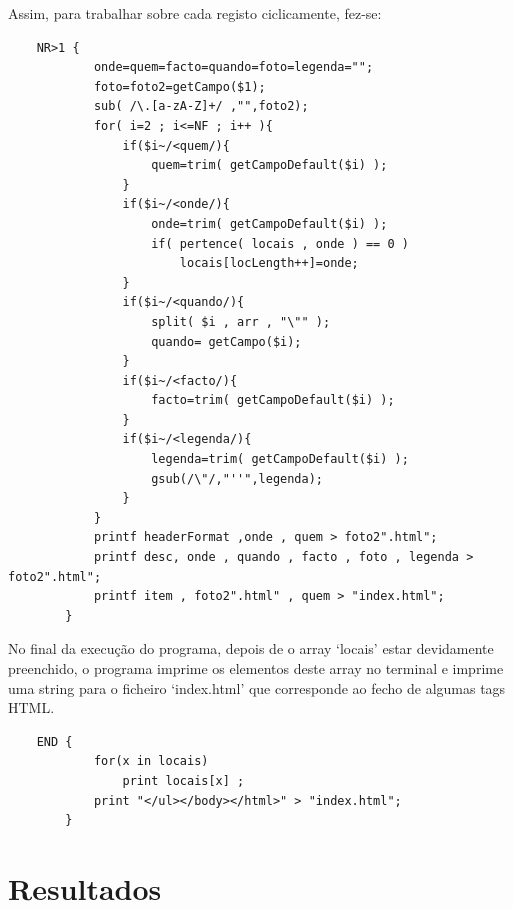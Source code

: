 \documentclass{report}
\begin{document}
Assim, para trabalhar sobre cada registo ciclicamente, fez-se:
\begin{verbatim}
	NR>1 {
	    	onde=quem=facto=quando=foto=legenda="";
	    	foto=foto2=getCampo($1);
	    	sub( /\.[a-zA-Z]+/ ,"",foto2);
	    	for( i=2 ; i<=NF ; i++ ){
	        	if($i~/<quem/){
	             	quem=trim( getCampoDefault($i) );
	        	}
	        	if($i~/<onde/){
	             	onde=trim( getCampoDefault($i) );
	             	if( pertence( locais , onde ) == 0 )
	                	locais[locLength++]=onde;
	        	}
	        	if($i~/<quando/){
	             	split( $i , arr , "\"" );
	             	quando= getCampo($i);
	        	}
	        	if($i~/<facto/){
	            	facto=trim( getCampoDefault($i) );
	        	}
	        	if($i~/<legenda/){
	            	legenda=trim( getCampoDefault($i) );
	            	gsub(/\"/,"''",legenda);
	        	}
	    	}
	    	printf headerFormat ,onde , quem > foto2".html";
	    	printf desc, onde , quando , facto , foto , legenda > foto2".html";
	    	printf item , foto2".html" , quem > "index.html";
		}
\end{verbatim}
No final da execução do programa, depois de o array ‘locais’ estar devidamente preenchido, o programa imprime os elementos deste array no terminal e imprime uma string para o ficheiro ‘index.html’ que corresponde ao fecho de algumas tags HTML.
\begin{verbatim}
	END {
	    	for(x in locais)
	        	print locais[x] ;
	    	print "</ul></body></html>" > "index.html";
		}
\end{verbatim}

\newpage
\section{Resultados}
\end{document}
